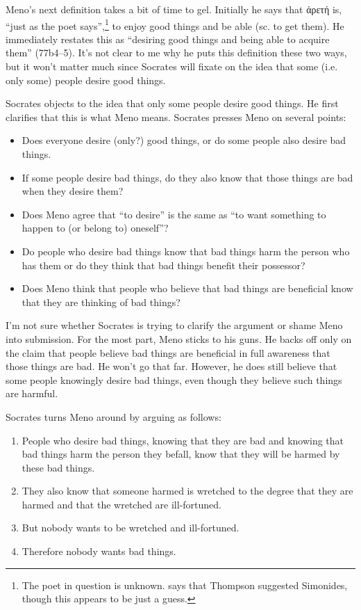 \documentclass[12pt,letterpaper]{article}
\begin{document}
Meno's next definition takes a bit of time to gel. Initially he says that \textgreek{ἀρετή} is, ``just as the poet says'',\footnote{The poet in question is unknown. \textcite[257]{bluck1961} says that Thompson suggested Simonides, though this appears to be just a guess.} to enjoy good things and be able (sc. to get them). He immediately restates this as ``desiring good things and being able to acquire them'' (77b4--5). It's not clear to me why he puts this definition these two ways, but it won't matter much since Socrates will fixate on the idea that some (i.e. only some) people desire good things.

Socrates objects to the idea that only some people desire good things. He first clarifies that this is what Meno means. Socrates presses Meno on several points:

\begin{itemize}
    \item Does everyone desire (only?) good things, or do some people also desire bad things.
    \item If some people desire bad things, do they also know that those things are bad when they desire them?
    \item Does Meno agree that ``to desire'' is the same as ``to want something to happen to (or belong to) oneself''?
    \item Do people who desire bad things know that bad things harm the person who has them or do they think that bad things benefit their possessor?
    \item Does Meno think that people who believe that bad things are beneficial know that they are thinking of bad things?
\end{itemize}

I'm not sure whether Socrates is trying to clarify the argument or shame Meno into submission. For the most part, Meno sticks to his guns. He backs off only on the claim that people believe bad things are beneficial in full awareness that those things are bad. He won't go that far. However, he does still believe that some people knowingly desire bad things, even though they believe such things are harmful.

Socrates turns Meno around by arguing as follows:

\begin{enumerate}
    \item People who desire bad things, knowing that they are bad and knowing that bad things harm the person they befall, know that they will be harmed by these bad things.
    \item They also know that someone harmed is wretched to the degree that they are harmed and that the wretched are ill-fortuned.
    \item But nobody wants to be wretched and ill-fortuned.
    \item Therefore nobody wants bad things.
\end{enumerate}
\end{document}
